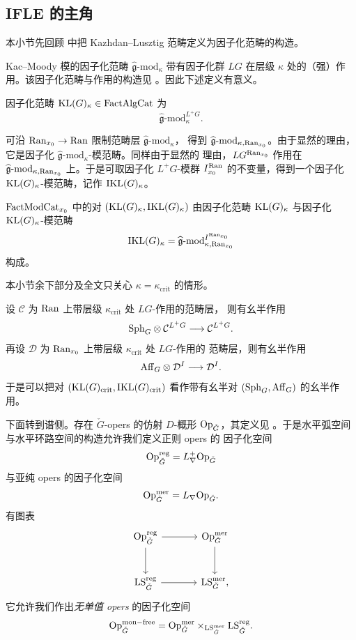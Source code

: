 
\subsection{IFLE 的主角}
\label{sec:ifle-characters}

本小节先回顾 \cite[2.1 节]{ABC+24a} 中把 Kazhdan–Lusztig 范畴定义为因子化范畴的构造。

Kac–Moody 模的因子化范畴 $\widehat{\mathfrak{g}}\text{-}\mathrm{mod}_\kappa$ 带有因子化群
$LG$ 在层级 $\kappa$ 处的（强）作用。该因子化范畴与作用的构造见
\cite[附录 B.14]{ABC+24a}。因此下述定义有意义。

\begin{definition}
\label{def:kl}
因子化范畴 $\mathrm{KL}(G)_\kappa\in \mathrm{FactAlgCat}$ 为
\[
\widehat{\mathfrak{g}}\text{-}\mathrm{mod}^{L^+G}_\kappa .
\]
\end{definition}

可沿 $\mathrm{Ran}_{x_0}\to \mathrm{Ran}$ 限制范畴层 $\widehat{\mathfrak{g}}\text{-}\mathrm{mod}_\kappa$，
得到 $\widehat{\mathfrak{g}}\text{-}\mathrm{mod}_{\kappa,\mathrm{Ran}_{x_0}}$。由于显然的理由，
它是因子化 $\widehat{\mathfrak{g}}\text{-}\mathrm{mod}_\kappa$-模范畴。同样由于显然的
理由，$LG^{\mathrm{Ran}_{x_0}}$ 作用在 $\widehat{\mathfrak{g}}\text{-}\mathrm{mod}_{\kappa,\mathrm{Ran}_{x_0}}$
上。于是可取因子化 $L^+G$-模群 $I^{\mathrm{Ran}}_{x_0}$ 的不变量，得到一个因子化
$\mathrm{KL}(G)_\kappa$-模范畴，记作 $\mathrm{IKL}(G)_\kappa$。

\begin{definition}
\label{def:ikl}
$\mathrm{FactModCat}_{x_0}$ 中的对 $(\mathrm{KL}(G)_\kappa,\mathrm{IKL}(G)_\kappa)$ 由因子化范畴 $\mathrm{KL}(G)_\kappa$
与因子化 $\mathrm{KL}(G)_\kappa$-模范畴
\[
\mathrm{IKL}(G)_\kappa
=\widehat{\mathfrak{g}}\text{-}\mathrm{mod}^{I^{\mathrm{Ran}_{x_0}}}_{\kappa,\mathrm{Ran}_{x_0}}
\]
构成。
\end{definition}

本小节余下部分及全文只关心 $\kappa=\kappa_{\mathrm{crit}}$ 的情形。

设 $\mathcal{C}$ 为 $\mathrm{Ran}$ 上带层级 $\kappa_{\mathrm{crit}}$ 处 $LG$-作用的范畴层，
则有幺半作用
\[
\mathrm{Sph}_G\otimes \mathcal{C}^{L^+G}\longrightarrow \mathcal{C}^{L^+G}.
\]
再设 $\mathcal{D}$ 为 $\mathrm{Ran}_{x_0}$ 上带层级 $\kappa_{\mathrm{crit}}$ 处 $LG$-作用的
范畴层，则有幺半作用
\[
\mathrm{Aff}_G\otimes \mathcal{D}^I\longrightarrow \mathcal{D}^I .
\]
于是可以把对 $(\mathrm{KL}(G)_{\mathrm{crit}},\mathrm{IKL}(G)_{\mathrm{crit}})$ 看作带有幺半对
$(\mathrm{Sph}_G,\mathrm{Aff}_G)$ 的幺半作用。

下面转到谱侧。存在 $\check G$-opers 的仿射 $D$-概形 $\mathrm{Op}_{\check G}$，其定义见
\cite[3.1.3 节]{ABC+24a}。于是水平弧空间与水平环路空间的构造允许我们定义正则 opers 的
因子化空间
\[
\mathrm{Op}^{\mathrm{reg}}_{\check G}=L^+_\nabla \mathrm{Op}_{\check G}
\]
与亚纯 opers 的因子化空间
\[
\mathrm{Op}^{\mathrm{mer}}_{\check G}=L_\nabla \mathrm{Op}_{\check G}.
\]
有图表
\[
\begin{tikzcd}[column sep=large,row sep=large]
\Op^{\reg}_{\check G} \arrow[r] \arrow[d] & \Op^{\mer}_{\check G} \arrow[d]\\
\LS^{\reg}_{\check G} \arrow[r] & \LS^{\mer}_{\check G},
\end{tikzcd}
\]
它允许我们作出\emph{无单值 opers} 的因子化空间
\[
\mathrm{Op}^{\mathrm{mon-free}}_{\check G}
=\mathrm{Op}^{\mathrm{mer}}_{\check G}\times_{\mathrm{LS}^{\mathrm{mer}}_{\check G}}\mathrm{LS}^{\mathrm{reg}}_{\check G}.
\]

